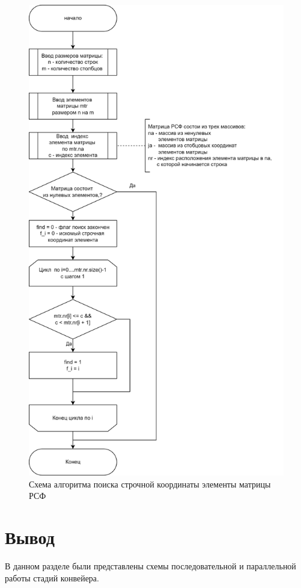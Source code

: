 \begin{figure}[h]
	\centering
	\includegraphics[height=0.85\textheight]{img/alg.png}
	\caption{Схема алгоритма поиска строчной координаты элементы матрицы РСФ}
	\label{fig:csr_diag}
\end{figure}

\clearpage

\section*{Вывод}
В данном разделе были представлены схемы последовательной и параллельной работы стадий конвейера.